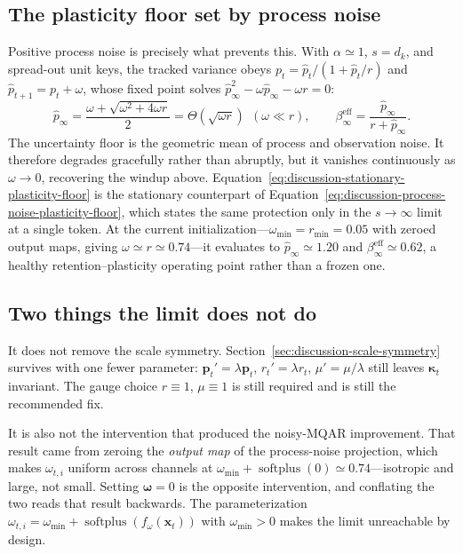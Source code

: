 \documentclass[11pt]{article}
\newcommand{\vct}[1]{\boldsymbol{#1}}
\begin{document}
\subsection{The plasticity floor set by process noise}

Positive process noise is precisely what prevents this. With $\alpha\simeq1$, $s=d_k$, and
spread-out unit keys, the tracked variance obeys $p_t=\widehat p_t/(1+\widehat p_t/r)$ and
$\widehat p_{t+1}=p_t+\omega$, whose fixed point solves
$\widehat p_\infty^2-\omega\widehat p_\infty-\omega r=0$:
\begin{equation}
  \widehat p_\infty
  =\frac{\omega+\sqrt{\omega^2+4\omega r}}{2}
  =\Theta\!\left(\sqrt{\omega r}\right)
  \ \ (\omega\ll r),
  \qquad
  \beta_\infty^{\mathrm{eff}}
  =\frac{\widehat p_\infty}{r+\widehat p_\infty}.
  \label{eq:discussion-stationary-plasticity-floor}
\end{equation}
The uncertainty floor is the geometric mean of process and observation noise. It therefore
degrades gracefully rather than abruptly, but it vanishes continuously as $\omega\to0$,
recovering the windup above. Equation~\eqref{eq:discussion-stationary-plasticity-floor} is the
stationary counterpart of Equation~\eqref{eq:discussion-process-noise-plasticity-floor}, which
states the same protection only in the $s\to\infty$ limit at a single token. At the current
initialization---$\omega_{\min}=r_{\min}=0.05$ with zeroed output maps, giving
$\omega\simeq r\simeq0.74$---it evaluates to $\widehat p_\infty\simeq1.20$ and
$\beta_\infty^{\mathrm{eff}}\simeq0.62$, a healthy retention--plasticity operating point rather
than a frozen one.

\subsection{Two things the limit does not do}

It does not remove the scale symmetry. Section~\ref{sec:discussion-scale-symmetry} survives with
one fewer parameter: $\vct{p}_t'=\lambda\vct{p}_t$, $r_t'=\lambda r_t$, $\mu'=\mu/\lambda$ still
leaves $\vct{\kappa}_t$ invariant. The gauge choice $r\equiv1$, $\mu\equiv1$ is still required
and is still the recommended fix.

It is also not the intervention that produced the noisy-MQAR improvement. That result came from
zeroing the \emph{output map} of the process-noise projection, which makes $\omega_{t,i}$ uniform
across channels at $\omega_{\min}+\operatorname{softplus}(0)\simeq0.74$---isotropic and large,
not small. Setting $\vct{\omega}=0$ is the opposite intervention, and conflating the two reads
that result backwards. The parameterization
$\omega_{t,i}=\omega_{\min}+\operatorname{softplus}(f_\omega(\vct{x}_t))$ with $\omega_{\min}>0$
makes the limit unreachable by design.
\end{document}
